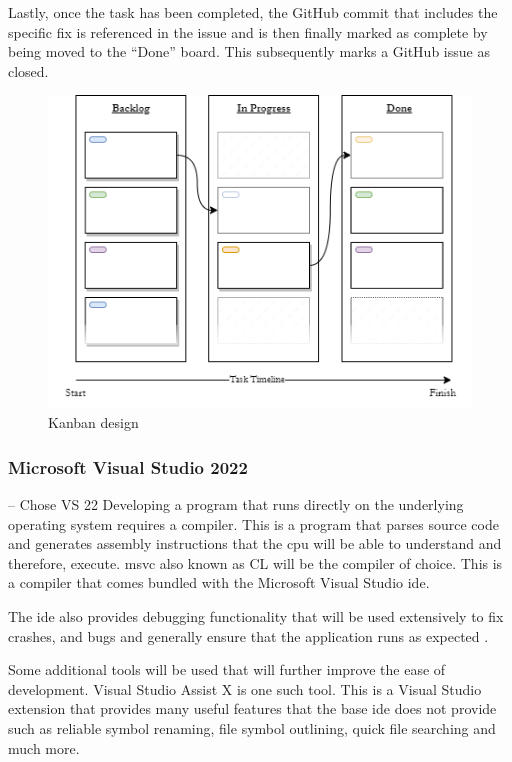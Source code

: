 \documentclass[11pt]{article}
\begin{document}
Lastly, once the task has been completed, the GitHub commit that includes the
specific fix is referenced in the issue and is then finally marked as complete
by being moved to the ``Done'' board. This subsequently marks a GitHub issue as
closed.
\begin{figure}[H]
  \centering
  \includegraphics[width=\textwidth]{images/kanban_design.png}
  \caption{Kanban design}
  \label{fig:kanban_design}
\end{figure}

\subsubsection{Microsoft Visual Studio 2022} \label{development_environment}

-- Chose VS 22
Developing a program that runs directly on the underlying operating system
requires a compiler. This is a program that parses source code and generates
assembly instructions that the \gls*{cpu} will be able to understand and
therefore, execute. \gls*{msvc} also known as CL will be the compiler of choice.
This is a compiler that comes bundled with the Microsoft Visual Studio
\gls*{ide}.

The \gls*{ide} also provides debugging functionality that will be used
extensively to fix crashes, and bugs and generally ensure that the application
runs as expected \cite{visualstudio}. 

Some additional tools will be used that will further improve the ease of
development.  Visual Studio Assist X \cite{visualstudioassistx} is one such
tool. This is a Visual Studio extension that provides many useful features that
the base \gls*{ide} does not provide such as reliable symbol renaming, file symbol
outlining, quick file searching and much more.
\end{document}
